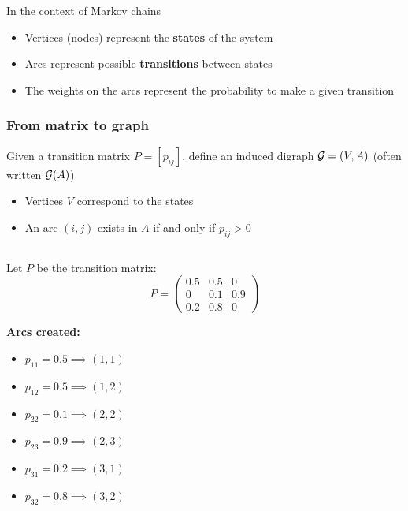 \documentclass[aspectratio=169]{beamer}\usepackage[]{graphicx}\usepackage[]{xcolor}
\begin{document}
\begin{frame}{In the context of Markov chains}
\begin{itemize}
    \item Vertices (nodes) represent the \textbf{states} of the system
    \vfill
    \item Arcs represent possible \textbf{transitions} between states
    \vfill
    \item The weights on the arcs represent the probability to make a given transition
\end{itemize}
\end{frame}


\begin{frame}
\frametitle{From matrix to graph}
    
Given a transition matrix $P = [p_{ij}]$, define an induced digraph $\mathcal{G} = (V, A)$ (often written $\mathcal{G}(A)$)

\begin{itemize}
\item Vertices $V$ correspond to the states
\item An arc $(i, j)$ exists in $A$ if and only if $p_{ij} > 0$
\end{itemize}

\begin{columns}[T] %

\begin{column}{.45\textwidth}
    Let $P$ be the transition matrix:
    $$ P = \begin{pmatrix}
        0.5 & 0.5 & 0   \\
        0   & 0.1 & 0.9 \\
        0.2 & 0.8 & 0
    \end{pmatrix} $$
    
    \vfill
    \textbf{Arcs created:}
    \begin{itemize}
        \item $p_{11}=0.5 \implies (1, 1)$
        \item $p_{12}=0.5 \implies (1, 2)$
        \item $p_{22}=0.1 \implies (2, 2)$
        \item $p_{23}=0.9 \implies (2, 3)$
        \item $p_{31}=0.2 \implies (3, 1)$
        \item $p_{32}=0.8 \implies (3, 2)$
    \end{itemize}
\end{column}


\end{columns}
\end{frame}
\end{document}
